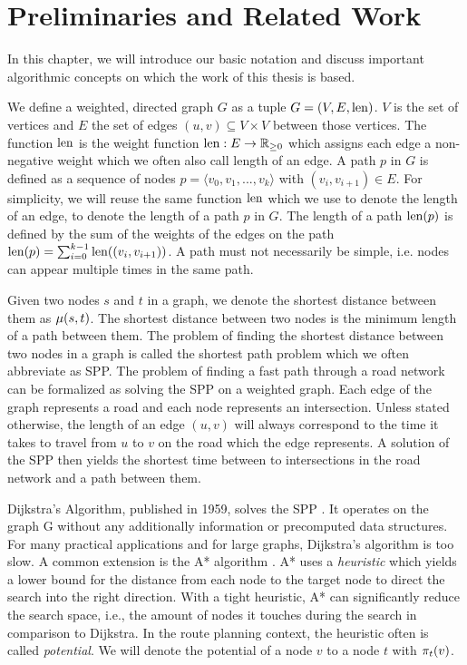 
\chapter{Preliminaries and Related Work}
\label{ch:preliminaries}
In this chapter, we will introduce our basic notation and discuss important algorithmic concepts on which the work of this thesis is based.

We define a weighted, directed graph $G$ as a tuple $G=(V,E,\operatorname{len})$. $V$ is the set of vertices and $E$ the set of edges $(u,v) \subseteq V \times V$ between those vertices. The function $\operatorname{len}$ is the weight function $\operatorname{len}: E \rightarrow \mathbb{R}_{\ge 0}$ which assigns each edge a non-negative weight which we often also call length of an edge. A path $p$ in $G$ is defined as a sequence of nodes $p = \langle v_0,v_1,...,v_k \rangle$ with $(v_i,v_{i+1}) \in E$. For simplicity, we will reuse the same function $\operatorname{len}$ which we use to denote the length of an edge, to denote the length of a path $p$ in $G$. The length of a path $\operatorname{len}(p)$ is defined by the sum of the weights of the edges on the path $\operatorname{len}(p) = \sum_{i=0}^{k-1}{\operatorname{len}((v_i,v_{i+1}))}$. A path must not necessarily be simple, i.e. nodes can appear multiple times in the same path.

Given two nodes $s$ and $t$ in a graph, we denote the shortest distance between them as $\mu(s,t)$. The shortest distance between two nodes is the minimum length of a path between them. The problem of finding the shortest distance between two nodes in a graph is called the shortest path problem which we often abbreviate as SPP. The problem of finding a fast path through a road network can be formalized as solving the SPP on a weighted graph. Each edge of the graph represents a road and each node represents an intersection. Unless stated otherwise, the length  of an edge $(u,v)$ will always correspond to the time it takes to travel from $u$ to $v$ on the road which the edge represents. A solution of the SPP then yields the shortest time between to intersections in the road network and a path between them.

Dijkstra's Algorithm, published in 1959, solves the SPP \cite{dijkstra:1959}. It operates on the graph G without any additionally information or precomputed data structures. For many practical applications and for large graphs, Dijkstra's algorithm is too slow. A common extension is the A* algorithm \cite{hart:1968}. A* uses a \emph{heuristic} which yields a lower bound for the distance from each node to the target node to direct the search into the right direction. With a tight heuristic, A* can significantly reduce the search space, i.e., the amount of nodes it touches during the search in comparison to Dijkstra. In the route planning context, the heuristic often is called \emph{potential}. We will denote the potential of a node $v$ to a node $t$ with $\pi_t(v)$.

